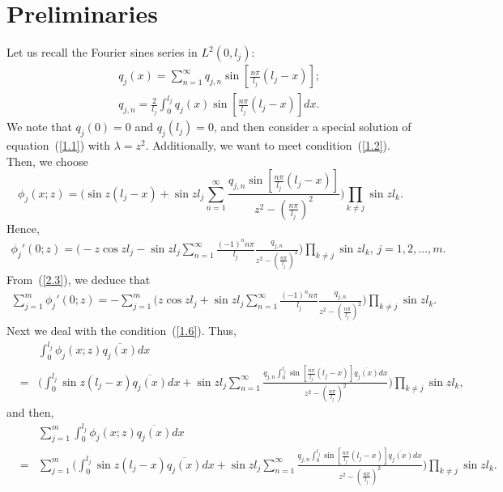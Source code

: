 \documentclass[10pt,a4paper]{article}
\theoremstyle{plain}
\theoremstyle{definition}
\theoremstyle{remark}
\numberwithin{equation}{section}
\begin{document}
\section{Preliminaries}
Let us recall the Fourier sines series in $L^{2}(0,l_{j})$:
\begin{eqnarray}
&&q_{j}(x)=\sum_{n=1}^{\infty}q_{j,n}\sin[\frac{n\pi}{l_{j}} (l_{j}-x)];\\
&&q_{j,n}=\frac{2}{l_{j}}\int_{0}^{l_{j}}q_{j}(x)\sin[\frac{n\pi}{l_{j}} (l_{j}-x)]dx.
\end{eqnarray}
We note that $q_{j}(0)=0$ and $q_{j}(l_{j})=0$, and then consider a special solution of equation~(\ref{1.1}) with $\lambda=z^{2}$. Additionally, we want to meet condition~(\ref{1.2}). Then, we choose
\begin{equation} \label{2.2}
\phi_{j}(x;z)=\Big(\sin{z(l_{j}-x)}+\sin{z l_{j}}\sum_{n=1}^{\infty}\frac{q_{j,n}\sin[\frac{n\pi}{l_{j}}(l_{j}-x)]}{z^{2}-(\frac{n\pi}{l_{j}})^{2}}\Big)\prod_{k\neq j}\sin{z l_{k}}.
\end{equation}
Hence,
\begin{eqnarray}\label{2.3}
\phi_{j}'(0;z)=\Big(-z\cos{z l_{j}}-\sin{z l_{j}}\sum_{n=1}^{\infty}\frac{(-1)^{n}n\pi}{l_{j}}\frac{q_{j,n}}{z^{2}-(\frac{n\pi}{l_{j}})^{2}}\Big)\prod_{k\neq j}\sin{z l_{k}},\,j=1,2,\ldots,m.
\end{eqnarray}
From~(\ref{2.3}), we deduce that
\begin{eqnarray}
\sum_{j=1}^{m}\phi_{j}'(0;z)=-\sum_{j=1}^{m}\Big(z\cos{z l_{j}}+\sin{z l_{j}}\sum_{n=1}^{\infty}\frac{(-1)^{n}n\pi}{l_{j}}\frac{q_{j,n}}{z^{2}-(\frac{n\pi}{l_{j}})^{2}}\Big)\prod_{k\neq j}\sin{z l_{k}}.\label{234}
\end{eqnarray}
Next we deal with the condition~(\ref{1.6}). Thus,
\begin{eqnarray}\nonumber
&&\int_{0}^{l_{j}}\phi_{j}(x;z)\overline{q_{j}(x)}dx\\&=&\Big(\int_{0}^{l_{j}}\sin{z(l_{j}-x)}\overline{q_{j}(x)}dx+\sin{z l_{j}}\sum_{n=1}^{\infty}\frac{q_{j,n}\int_{0}^{l_{j}}\sin[\frac{n\pi}{l_{j}}(l_{j}-x)]\overline{q_{j}(x)}dx}{z^{2}-(\frac{n\pi}{l_{j}})^{2}}\Big)\prod_{k\neq j}\sin{z l_{k}},
\end{eqnarray}
and then,
\begin{eqnarray}\nonumber
&&\sum_{j=1}^{m}\int_{0}^{l_{j}}\phi_{j}(x;z)\overline{q_{j}(x)}dx\\&=&\sum_{j=1}^{m}\Big(\int_{0}^{l_{j}}\sin{z(l_{j}-x)}\overline{q_{j}(x)}dx+\sin{z l_{j}}\sum_{n=1}^{\infty}\frac{q_{j,n}\int_{0}^{l_{j}}\sin[\frac{n\pi}{l_{j}}(l_{j}-x)]\overline{q_{j}(x)}dx}{z^{2}-(\frac{n\pi}{l_{j}})^{2}}\Big)\prod_{k\neq j}\sin{z l_{k}}.\label{233}
\end{eqnarray}
\end{document}
